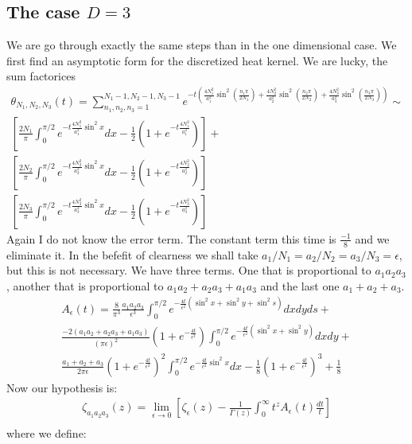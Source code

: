 \documentclass[12pt]{article}
\def\ep{\epsilon}
\begin{document}
\subsection{The case $D=3$}
We are go through exactly the same steps than in the one dimensional case. We first find an asymptotic form for the discretized heat kernel. We are lucky, the sum factorices
\begin{gather}
\theta_{N_1,N_2,N_3}(t)=\sum_{n_1,n_2,n_3=1}^{N_1-1,N_2-1,N_3-1}e^{-t\left(\frac{4N_1^2}{a_1^2}\sin^2\left(\frac{n_1\pi}{2N_1}\right)+ \frac{4N_2^2}{a_2^2}\sin^2\left(\frac{n_2\pi}{2N_2}\right)
+\frac{4N_3^2}{a_3^2}\sin^2\left(\frac{n_3\pi}{2N_3}\right)\right)}\sim\nonumber\\
\left[\frac{2N_1}{\pi}\int_0^{\pi/2}e^{-t\frac{4N_1^2}{a_1^2}\sin^2 x}dx-\frac{1}{2}\left(1+e^{-t\frac{4N_1^2}{a_1^2}}\right)\right]+\nonumber\\
\left[\frac{2N_2}{\pi}\int_0^{\pi/2}e^{-t\frac{4N_2^2}{a_2^2}\sin^2 x}dx-\frac{1}{2}\left(1+e^{-t\frac{4N_2^2}{a_2^2}}\right)\right]
\nonumber\\
\left[\frac{2N_3}{\pi}\int_0^{\pi/2}e^{-t\frac{4N_3^2}{a_3^2}\sin^2 x}dx-\frac{1}{2}\left(1+e^{-t\frac{4N_3^2}{a_3^2}}\right)\right]
\end{gather}
Again I do not know the error term. The constant term this time is $\frac{-1}{8}$ and we eliminate it. In the befefit of clearness we shall take $a_1/N_1=a_2/N_2=a_3/N_3=\ep$, but this is not necessary. We have three terms. One that is proportional to $a_1a_2a_3$, another that is proportional to $a_1a_2+a_2a_3+a_1a_3$ and the last one $a_1+a_2+a_3$.
\begin{gather}
A_{\ep}(t)=\frac{8}{\pi^3}\frac{a_1a_2a_3}{\ep^3}\int_0^{\pi/2} e^{-\frac{4t}{\ep^2}(\sin^2 x+\sin^2 y+\sin^2 s)}dxdyds+\nonumber \\ \frac{-2(a_1a_2+a_2a_3+a_1a_3)}{(\pi\ep)^2}\left(1+e^{-\frac{4t}{\ep^2}}\right)\int_0^{\pi/2}e^{-\frac{4t}{\ep^2}(\sin^2 x+\sin^2 y)}dxdy+\nonumber\\
\frac{a_1+a_2+a_3}{2\pi\ep}\left(1+e^{-\frac{4t}{\ep^2}}\right)^2\int_0^{\pi/2}e^{-\frac{4t}{\ep^2}\sin^2 x}dx- \frac{1}{8}\left(1+e^{-\frac{4t}{\ep^2}}\right)^3+\frac{1}{8}
\end{gather}
Now our hypothesis is:
\begin{gather}
\zeta_{a_1a_2a_3}(z)=\lim_{\ep\rightarrow 0}\left[ \zeta_\ep (z)-\frac{1}{\Gamma(z)}\int_0^\infty t^z A_\ep (t) \frac{dt}{t}\right]\\
\end{gather}
where we define:
\end{document}
